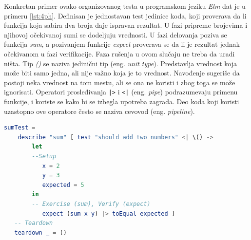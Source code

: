 \documentclass[12pt,oneside]{memoir}
\begin{document}
\par Konkretan primer ovako organizovanog testa u programskom jeziku \emph{Elm} dat je u primeru \ref{lst:4ph}. Definisan je jednostavan test jedinice koda, koji proverava da li funkcija koja sabira dva broja daje ispravan rezultat. U fazi pripreme brojevima i njihovoj očekivanoj sumi se dodeljuju vrednosti. U fazi delovanja poziva se funkcija \emph{sum}, a pozivanjem funkcije \emph{expect} proverava se da li je rezultat jednak očekivanom u fazi verifikacije. Faza rušenja u ovom slučaju ne treba da uradi ništa. Tip \emph{()} se naziva jedinični tip (eng. \emph{unit type}). Predstavlja vrednost koja može biti samo jedna, ali nije važno koja je to vrednost. Navođenje \emph{\textunderscore} sugeriše da postoji neka vrednost na tom mestu, ali se ona ne koristi i zbog toga se može ignorisati. Operatori prosleđivanja \texttt{|>} i \texttt{<|} (eng. \emph{pipe}) podrazumevaju primenu funkcije, i koriste se kako bi se izbegla upotreba zagrada. Deo koda koji koristi uzastopno ove operatore često se naziva cevovod (eng. \emph{pipeline}). 

\begin{minipage}{\linewidth}
\begin{lstlisting}[language=elm, basicstyle=\small, caption={Četiri faze testa koji proverava ispravnost
funkcije sabiranja dva broja},captionpos=b, label={lst:4ph}]
sumTest =
    describe "sum" [ test "should add two numbers" <| \() -> 
        let
        --Setup
           x = 2
           y = 3
           expected = 5
        in
        -- Exercise (sum), Verify (expect)
           expect (sum x y) |> toEqual expected ]
   -- Teardown
   teardown _ = ()
\end{lstlisting}
\end{minipage}
\end{document}
